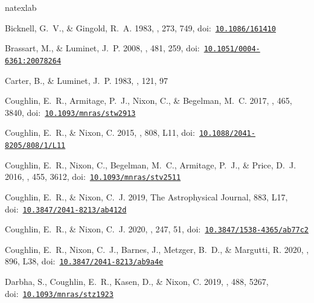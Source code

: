 \documentclass[twocolumn]{aastex62}
\begin{document}
\begin{thebibliography}{}
\expandafter\ifx\csname natexlab\endcsname\relax\def\natexlab#1{#1}\fi
\providecommand{\url}[1]{\href{#1}{#1}}
\providecommand{\dodoi}[1]{doi:~\href{http://doi.org/#1}{\nolinkurl{#1}}}
\providecommand{\doeprint}[1]{\href{http://ascl.net/#1}{\nolinkurl{http://ascl.net/#1}}}
\providecommand{\doarXiv}[1]{\href{https://arxiv.org/abs/#1}{\nolinkurl{https://arxiv.org/abs/#1}}}

{Bicknell}, G.~V., \& {Gingold}, R.~A. 1983, \apj, 273, 749,
  \dodoi{10.1086/161410}

{Brassart}, M., \& {Luminet}, J.~P. 2008, \aap, 481, 259,
  \dodoi{10.1051/0004-6361:20078264}

{Carter}, B., \& {Luminet}, J.~P. 1983, \aap, 121, 97

{Coughlin}, E.~R., {Armitage}, P.~J., {Nixon}, C., \& {Begelman}, M.~C. 2017,
  \mnras, 465, 3840, \dodoi{10.1093/mnras/stw2913}

{Coughlin}, E.~R., \& {Nixon}, C. 2015, \apjl, 808, L11,
  \dodoi{10.1088/2041-8205/808/1/L11}

{Coughlin}, E.~R., {Nixon}, C., {Begelman}, M.~C., {Armitage}, P.~J., \&
  {Price}, D.~J. 2016, \mnras, 455, 3612, \dodoi{10.1093/mnras/stv2511}

Coughlin, E.~R., \& Nixon, C.~J. 2019, The Astrophysical Journal, 883, L17,
  \dodoi{10.3847/2041-8213/ab412d}

{Coughlin}, E.~R., \& {Nixon}, C.~J. 2020, \apjs, 247, 51,
  \dodoi{10.3847/1538-4365/ab77c2}

{Coughlin}, E.~R., {Nixon}, C.~J., {Barnes}, J., {Metzger}, B.~D., \&
  {Margutti}, R. 2020, \apjl, 896, L38, \dodoi{10.3847/2041-8213/ab9a4e}

{Darbha}, S., {Coughlin}, E.~R., {Kasen}, D., \& {Nixon}, C. 2019, \mnras, 488,
  5267, \dodoi{10.1093/mnras/stz1923}


\end{thebibliography}
\end{document}
